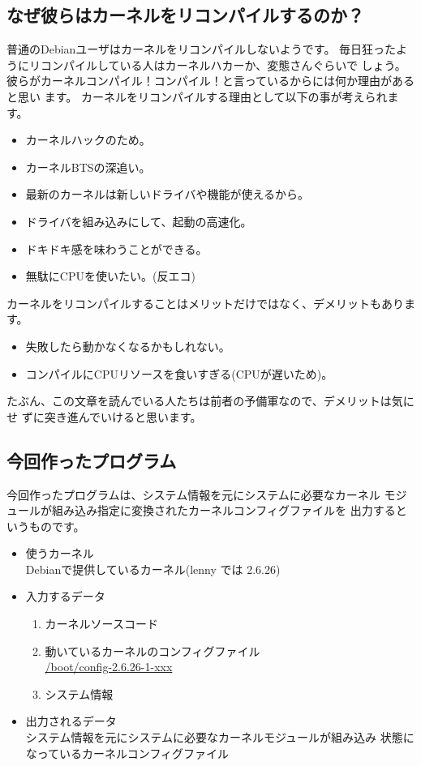 \documentclass[mingoth,a4paper]{jsarticle}
\begin{document}
\subsection{なぜ彼らはカーネルをリコンパイルするのか？}

普通のDebianユーザはカーネルをリコンパイルしないようです。
毎日狂ったようにリコンパイルしている人はカーネルハカーか、変態さんぐらいで
しょう。
彼らがカーネルコンパイル！コンパイル！と言っているからには何か理由があると思い
ます。
カーネルをリコンパイルする理由として以下の事が考えられます。
\begin{itemize}
\item カーネルハックのため。
\item カーネルBTSの深追い。
\item 最新のカーネルは新しいドライバや機能が使えるから。
\item ドライバを組み込みにして、起動の高速化。
\item ドキドキ感を味わうことができる。
\item 無駄にCPUを使いたい。(反エコ)
\end{itemize}

カーネルをリコンパイルすることはメリットだけではなく、デメリットもありま
す。
\begin{itemize}
\item 失敗したら動かなくなるかもしれない。
\item コンパイルにCPUリソースを食いすぎる(CPUが遅いため)。
\end{itemize}

たぶん、この文章を読んでいる人たちは前者の予備軍なので、デメリットは気にせ
ずに突き進んでいけると思います。

\subsection{今回作ったプログラム}

今回作ったプログラムは、システム情報を元にシステムに必要なカーネル
モジュールが組み込み指定に変換されたカーネルコンフィグファイルを
出力するというものです。

\begin{itemize}
\item 使うカーネル\\
      Debianで提供しているカーネル(lenny では 2.6.26)
\item 入力するデータ
\begin{enumerate}
  \item カーネルソースコード
  \item 動いているカーネルのコンフィグファイル\\
	\url{/boot/config-2.6.26-1-xxx}
  \item システム情報
\end{enumerate}
\item 出力されるデータ\\
      システム情報を元にシステムに必要なカーネルモジュールが組み込み
      状態になっているカーネルコンフィグファイル
\end{itemize}
     
\end{document}
